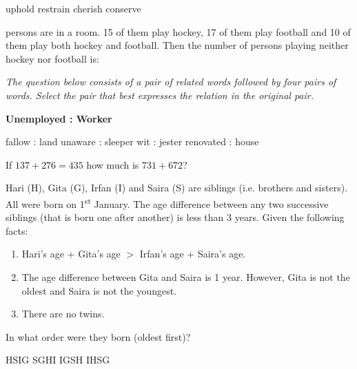 \documentclass{exam}
\begin{document}
\begin{questions}
\begin{oneparchoices}
	\choice uphold \choice restrain \choice cherish \choice conserve
\end{oneparchoices}

 persons are in a room. 15 of them play hockey, 17 of them play football and 10 of them play both hockey and football. Then the number of persons playing neither hockey nor football is:\hfill{}

\begin{oneparchoices}
	   
\end{oneparchoices}

\question \textit{The question below consists of a pair of related words followed by four pairs of words. Select the pair that best expresses the relation in the original pair.}\hfill{}
	\par\noindent\textbf{Unemployed : Worker}

\begin{oneparchoices}
	\choice fallow : land \choice unaware : sleeper \choice wit : jester \choice renovated : house
\end{oneparchoices}

\question If $137 + 276 = 435$ how much is $731 + 672$?\hfill{}

\begin{oneparchoices}
	   
\end{oneparchoices}

\question Hari (H), Gita (G), Irfan (I) and Saira (S) are siblings (i.e. brothers and sisters). All were born on 1\textsuperscript{st} January. The age difference between any two successive siblings (that is born one after another) is less than 3 years. Given the following facts:

\begin{enumerate}
		\item Hari's age + Gita's age $>$ Irfan's age + Saira's age.
		\item The age difference between Gita and Saira is 1 year. However, Gita is not the oldest and Saira is not the youngest.
		\item There are no twins.
	\end{enumerate}
	In what order were they born (oldest first)?\hfill{}


\begin{oneparchoices}
	\choice HSIG \choice SGHI \choice IGSH \choice IHSG
\end{oneparchoices}


\end{questions}
\end{document}
